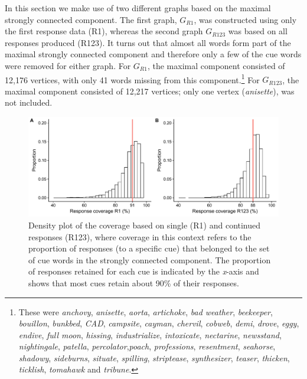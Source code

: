 \documentclass[a4paper,doc,natbib,floatsintext]{apa6}
\newcommand{\stim}[1]{\textsl{#1}}
\begin{document}
In this section we make use of two different graphs based on the maximal strongly connected component. The first graph, $G_{R1}$, was constructed using only the first response data (R1), whereas the second graph $G_{R123}$ was based on all responses produced (R123). It turns out that almost all words form part of the maximal strongly connected component and therefore only a few of the cue words were removed for either graph. For $G_{R1}$, the maximal component consisted of 12,176  vertices, with only 41 words missing from this component.\footnote{These were \stim{anchovy}, \stim{anisette}, \stim{aorta}, \stim{artichoke}, \stim{bad weather}, \stim{beekeeper}, \stim{bouillon}, \stim{bunkbed}, \stim{CAD}, \stim{campsite}, \stim{cayman}, \stim{chervil},  \stim{cobweb}, \stim{demi}, \stim{drove}, \stim{eggy}, \stim{endive}, \stim{full moon}, \stim{hissing}, \stim{industrialize},  \stim{intoxicate}, \stim{nectarine}, \stim{newsstand}, \stim{nightingale}, \stim{patella}, \stim{percolator},\stim{poach}, \stim{professions}, \stim{resentment}, \stim{seahorse}, \stim{shadowy}, \stim{sideburns}, \stim{situate}, \stim{spilling}, \stim{striptease}, \stim{synthesizer}, \stim{teaser}, \stim{thicken}, \stim{ticklish}, \stim{tomahawk} and \stim{tribune}.} For $G_{R123}$, the maximal component consisted of 12,217 vertices; only one vertex (\stim{anisette}), was not included.

\begin{figure}[t]
  \centering
    \includegraphics[width=14.5cm]{figures/responseCoverage.pdf}
  \caption{Density plot of the coverage based on single (R1) and continued responses (R123), where coverage in this context refers to the proportion of responses (to a specific cue) that belonged to the set of cue words in the strongly connected component. The proportion of responses retained for each cue is indicated by the \textit{x}-axis and shows that most cues retain about 90\% of their responses. }
  \label{figure:Coverage}
\end{figure}
\end{document}
